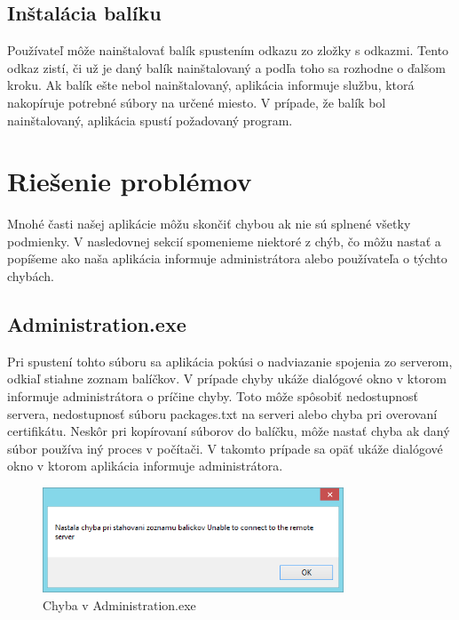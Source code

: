 \subsection{Inštalácia balíku}
Používateľ môže nainštalovať balík spustením odkazu zo zložky s odkazmi. Tento odkaz zistí, či už je daný balík nainštalovaný a podľa toho sa rozhodne o ďalšom kroku. Ak balík ešte nebol nainštalovaný, aplikácia informuje službu, ktorá nakopíruje potrebné súbory na určené miesto. V prípade, že balík bol nainštalovaný, aplikácia spustí požadovaný program.

\section{Riešenie problémov}
Mnohé časti našej aplikácie môžu skončiť chybou ak nie sú splnené všetky podmienky. V nasledovnej sekcií spomenieme niektoré z chýb, čo môžu nastať a popíšeme ako naša aplikácia informuje administrátora alebo používateľa o týchto chybách.

\subsection{Administration.exe}
Pri spustení tohto súboru sa aplikácia pokúsi o nadviazanie spojenia zo serverom, odkiaľ stiahne zoznam balíčkov. V prípade chyby ukáže dialógové okno v ktorom informuje administrátora o príčine chyby. Toto môže spôsobiť nedostupnosť servera, nedostupnosť súboru packages.txt na serveri alebo chyba pri overovaní certifikátu. Neskôr pri kopírovaní súborov do balíčku, môže nastať chyba ak daný súbor používa iný proces v počítači. V takomto prípade sa opäť ukáže dialógové okno v ktorom aplikácia informuje administrátora.
\begin{figure}[h]
    \centering
    \includegraphics[width=0.8\textwidth]{erroradmin}
    \caption{Chyba v Administration.exe}
    \label{fig:adminerror}
\end{figure}

